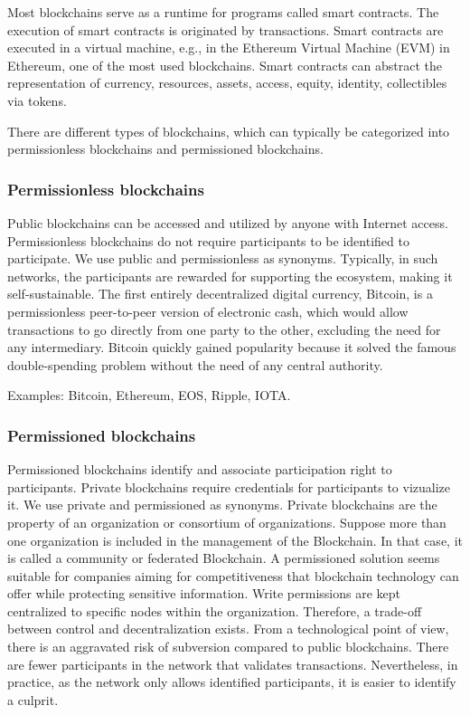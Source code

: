\documentclass[12pt,a4paper]{article}
\theoremstyle{definition}
\begin{document}
Most blockchains serve as a runtime for programs called smart contracts. The execution of smart contracts is originated by transactions. Smart contracts are executed in a virtual machine, e.g., in the Ethereum Virtual Machine (EVM) in Ethereum, one of the most used blockchains. Smart contracts can abstract the representation of currency, resources, assets, access, equity, identity, collectibles via tokens.

There are different types of blockchains, which can typically be categorized into permissionless blockchains and permissioned blockchains.

\subsubsection{Permissionless blockchains}
Public blockchains can be accessed and utilized by anyone with Internet access. Permissionless blockchains do not require participants to be identified to participate. We use public and permissionless as synonyms. Typically, in such networks, the participants are rewarded for supporting the ecosystem, making it self-sustainable. The first entirely decentralized digital currency, Bitcoin, is a permissionless peer-to-peer version of electronic cash, which would allow transactions to go directly from one party to the other, excluding the need for any intermediary. Bitcoin quickly gained popularity because it solved the famous double-spending problem without the need of any central authority.

Examples: Bitcoin, Ethereum, EOS, Ripple, IOTA.

\subsubsection{Permissioned blockchains}
Permissioned blockchains identify and associate participation right to participants. Private blockchains require credentials for participants to vizualize it. We use private and permissioned as synonyms. Private blockchains are the property of an organization or consortium of organizations. Suppose more than one organization is included in the management of the Blockchain. In that case, it is called a community or federated Blockchain. A permissioned solution seems suitable for companies aiming for competitiveness that blockchain technology can offer while protecting sensitive information. Write permissions are kept centralized to specific nodes within the organization. Therefore, a trade-off between control and decentralization exists. From a technological point of view, there is an aggravated risk of subversion compared to public blockchains. There are fewer participants in the network that validates transactions. Nevertheless, in practice, as the network only allows identified participants, it is easier to identify a culprit.
\end{document}
